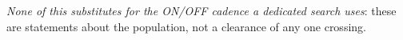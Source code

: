 \emph{None of this substitutes for the ON/OFF
cadence a dedicated search uses}: these are statements about the population,
not a clearance of any one crossing.

